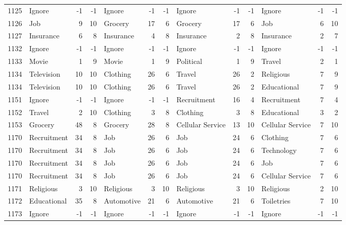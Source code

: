 \begin{figure}[htbp]
\begin{tabular}{rlrrlrrlrrlrr}
    1125  & Ignore & -1    & -1    & Ignore & -1    & -1    & Ignore & -1    & -1    & Ignore & -1    & -1 \\
    1126  & Job   & 9     & 10    & Grocery & 17    & 6     & Grocery & 17    & 6     & Job   & 6     & 10 \\
    1127  & Insurance & 6     & 8     & Insurance & 4     & 8     & Insurance & 2     & 8     & Insurance & 2     & 7 \\
    1132  & Ignore & -1    & -1    & Ignore & -1    & -1    & Ignore & -1    & -1    & Ignore & -1    & -1 \\
    1133  & Movie & 1     & 9     & Movie & 1     & 9     & Political & 1     & 9     & Travel & 2     & 1 \\
    1134  & Television & 10    & 10    & Clothing & 26    & 6     & Travel & 26    & 2     & Religious & 7     & 9 \\
    1134  & Television & 10    & 10    & Clothing & 26    & 6     & Travel & 26    & 2     & Educational & 7     & 9 \\
    1151  & Ignore & -1    & -1    & Ignore & -1    & -1    & Recruitment & 16    & 4     & Recruitment & 7     & 4 \\
    1152  & Travel & 2     & 10    & Clothing & 3     & 8     & Clothing & 3     & 8     & Educational & 3     & 2 \\
    1153  & Grocery & 48    & 8     & Grocery & 28    & 8     & Cellular Service & 13    & 10    & Cellular Service & 7     & 10 \\
    1170  & Recruitment & 34    & 8     & Job   & 26    & 6     & Job   & 24    & 6     & Clothing & 7     & 6 \\
    1170  & Recruitment & 34    & 8     & Job   & 26    & 6     & Job   & 24    & 6     & Technology & 7     & 6 \\
    1170  & Recruitment & 34    & 8     & Job   & 26    & 6     & Job   & 24    & 6     & Job   & 7     & 6 \\
    1170  & Recruitment & 34    & 8     & Job   & 26    & 6     & Job   & 24    & 6     & Cellular Service & 7     & 6 \\
    1171  & Religious & 3     & 10    & Religious & 3     & 10    & Religious & 3     & 10    & Religious & 2     & 10 \\
    1172  & Educational & 35    & 8     & Automotive & 21    & 6     & Automotive & 21    & 6     & Toiletries & 7     & 10 \\
    1173  & Ignore & -1    & -1    & Ignore & -1    & -1    & Ignore & -1    & -1    & Ignore & -1    & -1 \\

\end{tabular}
\end{figure}
